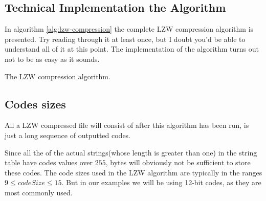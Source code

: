 \begin{refsection}
\section{Technical Implementation the Algorithm}
\label{sec:lzw-enc-algorithm}

In algorithm \ref{alg:lzw-compression} the complete LZW compression
algorithm is presented. Try reading through it at least once,
but I doubt you'd be able to understand all of it at this point. The
implementation of the algorithm turns out not to be as easy as it
sounds.

\begin{algorithm}[H]
  \caption{The LZW compression algorithm.}
  \label{alg:lzw-compression}
  \begin{algorithmic}[1]

    \While{\neof}

       \label{algl:hasingcheckintable}
         \label{algl:hasgetcode}
      \Else
        \State {}


          \State {}\label{algl:hashadd}

        \EndIf


      \EndIf


    \EndWhile

    \State {}
    \State {}

  \end{algorithmic}
\end{algorithm}

\subsection{Codes sizes}

All a LZW compressed file will consist of after this algorithm has
been run, is just a long sequence of outputted codes.

Since all the of the actual strings(whose length is greater than one)
in the string table have codes values over $255$, bytes will obviously
not be sufficient to store these codes. The code sizes used in the LZW algorithm are typically in the ranges $9 \leq
codeSize \leq 15$. But in our examples we will be using 12-bit codes,
as they are most commonly used.


\end{refsection}
